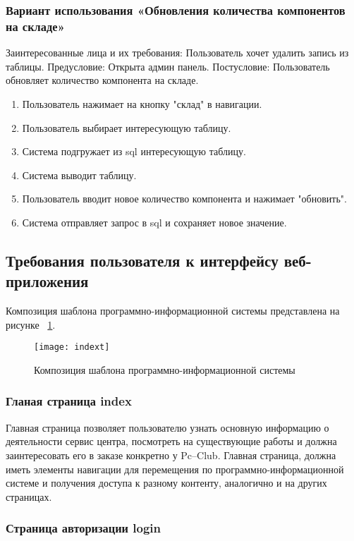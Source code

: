 \subsubsection{Вариант использования «Обновления количества компонентов на складе»}
Заинтересованные лица и их требования: Пользователь хочет удалить запись из таблицы.
Предусловие: Открыта админ панель.
Постусловие: Пользователь обновляет количество компонента на складе.
\begin{enumerate}
	\item Пользователь нажимает на кнопку "склад" в навигации.
	\item Пользователь выбирает интересующую таблицу.
	\item Система подгружает из sql интересующую таблицу.
	\item Система выводит таблицу.
	\item Пользователь вводит новое количество компонента и нажимает "обновить".
	\item Система отправляет запрос в sql и сохраняет новое значение.
\end{enumerate}
\newpage
\subsection{Требования пользователя к интерфейсу веб-приложения}

Композиция шаблона программно-информационной системы представлена на рисунке ~\ref{indext:image}.

\begin{figure}[ht]
\texttt{[image: indext]}
\caption{Композиция шаблона программно-информационной системы}
\label{indext:image}
\end{figure}

\subsubsection{Гланая страница index}

Главная страница позволяет пользователю узнать основную информацию о деятельности сервис центра, посмотреть на существующие работы и должна заинтересовать его в заказе конкретно у Pc--Club. Главная страница, должна иметь элементы навигации для перемещения по программно-информационной системе и получения доступа к разному контенту, аналогично и на других страницах.

\subsubsection{Страница авторизации login}

